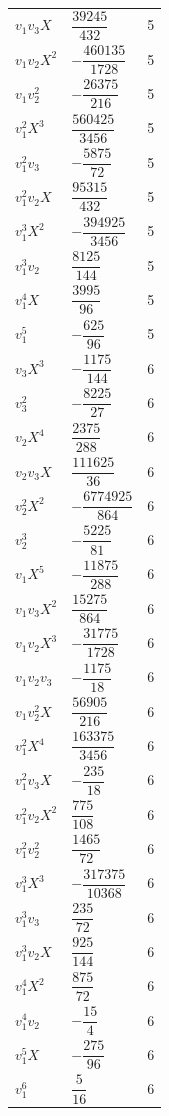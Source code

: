 \documentclass[11pt,a4paper]{article}
\numberwithin{equation}{section}
\begin{document}
\begin{longtable}{lll}
$v_1 v_3 X$ & $\dfrac{39245}{432}$ & 5 \\
$v_1 v_2 X^{2}$ & $-\dfrac{460135}{1728}$ & 5 \\
$v_1 v_2^{2}$ & $-\dfrac{26375}{216}$ & 5 \\
$v_1^{2} X^{3}$ & $\dfrac{560425}{3456}$ & 5 \\
$v_1^{2} v_3$ & $-\dfrac{5875}{72}$ & 5 \\
$v_1^{2} v_2 X$ & $\dfrac{95315}{432}$ & 5 \\
$v_1^{3} X^{2}$ & $-\dfrac{394925}{3456}$ & 5 \\
$v_1^{3} v_2$ & $\dfrac{8125}{144}$ & 5 \\
$v_1^{4} X$ & $\dfrac{3995}{96}$ & 5 \\
$v_1^{5}$ & $-\dfrac{625}{96}$ & 5 \\
$v_3 X^{3}$ & $-\dfrac{1175}{144}$ & 6 \\
$v_3^{2}$ & $-\dfrac{8225}{27}$ & 6 \\
$v_2 X^{4}$ & $\dfrac{2375}{288}$ & 6 \\
$v_2 v_3 X$ & $\dfrac{111625}{36}$ & 6 \\
$v_2^{2} X^{2}$ & $-\dfrac{6774925}{864}$ & 6 \\
$v_2^{3}$ & $-\dfrac{5225}{81}$ & 6 \\
$v_1 X^{5}$ & $-\dfrac{11875}{288}$ & 6 \\
$v_1 v_3 X^{2}$ & $\dfrac{15275}{864}$ & 6 \\
$v_1 v_2 X^{3}$ & $-\dfrac{31775}{1728}$ & 6 \\
$v_1 v_2 v_3$ & $-\dfrac{1175}{18}$ & 6 \\
$v_1 v_2^{2} X$ & $\dfrac{56905}{216}$ & 6 \\
$v_1^{2} X^{4}$ & $\dfrac{163375}{3456}$ & 6 \\
$v_1^{2} v_3 X$ & $-\dfrac{235}{18}$ & 6 \\
$v_1^{2} v_2 X^{2}$ & $\dfrac{775}{108}$ & 6 \\
$v_1^{2} v_2^{2}$ & $\dfrac{1465}{72}$ & 6 \\
$v_1^{3} X^{3}$ & $-\dfrac{317375}{10368}$ & 6 \\
$v_1^{3} v_3$ & $\dfrac{235}{72}$ & 6 \\
$v_1^{3} v_2 X$ & $\dfrac{925}{144}$ & 6 \\
$v_1^{4} X^{2}$ & $\dfrac{875}{72}$ & 6 \\
$v_1^{4} v_2$ & $-\dfrac{15}{4}$ & 6 \\
$v_1^{5} X$ & $-\dfrac{275}{96}$ & 6 \\
$v_1^{6}$ & $\dfrac{5}{16}$ & 6 \\
\bottomrule
\end{longtable}
\endgroup
\end{document}
